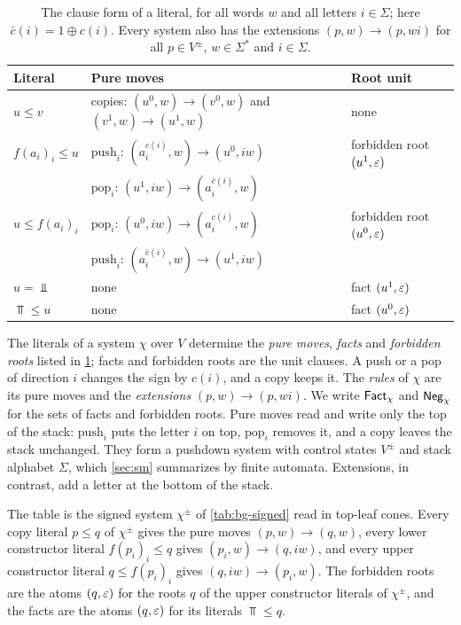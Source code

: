 \begin{table}[t]
\caption{The clause form of a literal, for all words $w$ and all letters
$i\in\Sigma$; here $\bar c(i)=1\oplus c(i)$. Every system also has the
extensions $(p,w)\to(p,wi)$ for all $p\in V^\pm$, $w\in\Sigma^*$ and
$i\in\Sigma$.}
\label{tab:lf-clauses}
\centering
\begin{tabular}{@{}lll@{}}
\toprule
Literal & Pure moves & Root unit\\
\midrule
$u\le v$ & copies: $(u^0,w)\to(v^0,w)$ and $(v^1,w)\to(u^1,w)$ & none\\[2pt]
$f(a_i)_i\le u$ & $\mathrm{push}_i$: $(a_i^{c(i)},w)\to(u^0,iw)$
 & forbidden root $(u^1,\varepsilon)$\\
 & $\mathrm{pop}_i$: $(u^1,iw)\to(a_i^{\bar c(i)},w)$ & \\[2pt]
$u\le f(a_i)_i$ & $\mathrm{pop}_i$: $(u^0,iw)\to(a_i^{c(i)},w)$
 & forbidden root $(u^0,\varepsilon)$\\
 & $\mathrm{push}_i$: $(a_i^{\bar c(i)},w)\to(u^1,iw)$ & \\[2pt]
$u=\Bot$ & none & fact $(u^1,\varepsilon)$\\
$\Top\le u$ & none & fact $(u^0,\varepsilon)$\\
\bottomrule
\end{tabular}
\end{table}

The literals of a system $\chi$ over $V$ determine the \emph{pure moves},
\emph{facts} and \emph{forbidden roots} listed in
\cref{tab:lf-clauses}; facts and forbidden roots are the unit clauses. A push or a pop of direction $i$ changes the sign by
$c(i)$, and a copy keeps it. The \emph{rules} of $\chi$ are its pure moves and
the \emph{extensions} $(p,w)\to(p,wi)$. We write $\mathsf{Fact}_\chi$ and $\mathsf{Neg}_\chi$
for the sets of facts and forbidden roots. Pure moves read and write
only the top of the stack: $\mathrm{push}_i$ puts the letter $i$ on top,
$\mathrm{pop}_i$ removes it, and a copy leaves the stack unchanged. They form a
pushdown system with control states $V^\pm$ and stack alphabet $\Sigma$,
which \cref{sec:sm} summarizes by finite automata. Extensions, in contrast,
add a letter at the bottom of the stack.

The table is the signed system $\chi^\pm$ of \cref{tab:bg-signed} read in
top-leaf cones. Every copy literal $p\le q$ of $\chi^\pm$ gives the pure moves
$(p,w)\to(q,w)$, every lower constructor literal $f(p_i)_i\le q$ gives
$(p_i,w)\to(q,iw)$, and every upper constructor literal $q\le f(p_i)_i$ gives
$(q,iw)\to(p_i,w)$. The forbidden roots are the atoms $(q,\varepsilon)$ for the roots
$q$ of the upper constructor literals of $\chi^\pm$, and the facts
are the atoms $(q,\varepsilon)$ for its literals $\Top\le q$.

